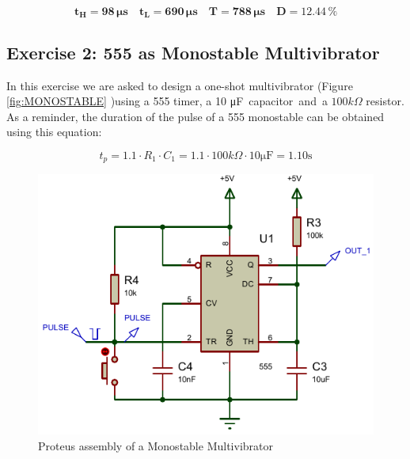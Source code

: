 \vspace{-.4cm}

\begin{equation*}
    \mathbf{t_H} = \mathbf{98 \, \si\micro \text{s}} \quad
    \mathbf{t_L} = \mathbf{690 \, \si\micro \text{s}} \quad
    \mathbf{T} = \mathbf{788 \, \si\micro \text{s}} \quad
    \mathbf{D} =  \mathbf{12.44 \, \text{\%}} 
\end{equation*}


\subsection{Exercise 2: 555 as Monostable Multivibrator}

In this exercise we are asked to design a one-shot multivibrator (Figure \ref{fig:MONOSTABLE} )using a 555 timer, a 10 \si\micro F capacitor and a $100k\Omega$ resistor. As a reminder, the duration of the pulse of a 555 monostable can be obtained using this equation:

\begin{equation*}
    t_{p} = 1.1 \cdot R_1 \cdot C_1 = 1.1 \cdot 100k\Omega \cdot 10 \si\micro \text{F} = 1.10 \text{s}
\end{equation*}


\begin{figure}[H]
    \centering
    \includegraphics[scale = 1.045]{Graphics/VHDL/Practice 2/GRAPHICS/555/GRAPHS/PROTEUS/ASSEMBLY/555_MONO_ASSEMBLY.PDF}
    \caption{Proteus assembly of a Monostable Multivibrator}
    \label{fig:555_MONO_ASSEMBLY}
\end{figure}


